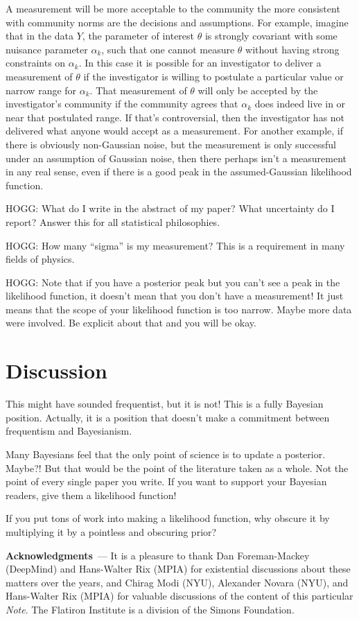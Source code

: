 \documentclass{article}
\renewcommand{\paragraph}[1]{\bigskip\par\noindent\textbf{#1}~---}
\newcommand{\documentname}{\textsl{Note}}
\begin{document}
A measurement will be more acceptable to the community the more consistent with community norms are the decisions and assumptions.
For example, imagine that in the data $Y$, the parameter of interest $\theta$ is strongly covariant with some nuisance parameter $\alpha_k$,
such that one cannot measure $\theta$ without having strong constraints on $\alpha_k$.
In this case it is possible for an investigator to deliver a measurement of $\theta$ if the investigator is willing to postulate a particular value or narrow range for $\alpha_k$.
That measurement of $\theta$ will only be accepted by the investigator's community if the community agrees that $\alpha_k$ does indeed live in or near that postulated range.
If that's controversial, then the investigator has not delivered what anyone would accept as a measurement.
For another example, if there is obviously non-Gaussian noise, but the measurement is only successful under an assumption of Gaussian noise, then there perhaps isn't a measurement in any real sense, even if there is a good peak in the assumed-Gaussian likelihood function.

HOGG: What do I write in the abstract of my paper? What uncertainty do I report? Answer this for all statistical philosophies.

HOGG: How many ``sigma'' is my measurement? This is a requirement in many fields of physics.

HOGG: Note that if you have a posterior peak but you can't see a peak in the likelihood function, it doesn't mean that you don't have a measurement! It just means that the scope of your likelihood function is too narrow. Maybe more data were involved. Be explicit about that and you will be okay.

\section{Discussion}\label{sec:discussion}
This might have sounded frequentist, but it is not!
This is a fully Bayesian position.
Actually, it is a position that doesn't make a commitment between frequentism and Bayesianism.

Many Bayesians feel that the only point of science is to update a posterior. Maybe?! But that would be the point of the literature taken as a whole. Not the point of every single paper you write.
If you want to support your Bayesian readers, give them a likelihood function!

If you put tons of work into making a likelihood function, why obscure it by multiplying it by a pointless and obscuring prior?

\paragraph{Acknowledgments}
It is a pleasure to thank
  Dan Foreman-Mackey (DeepMind) and
  Hans-Walter Rix (MPIA)
for existential discussions about these matters over the years, and
  Chirag Modi (NYU),
  Alexander Novara (NYU), and
  Hans-Walter Rix (MPIA)
for valuable discussions of the content of this particular \documentname.
The Flatiron Institute is a division of the Simons Foundation.

\raggedright


\end{document}
